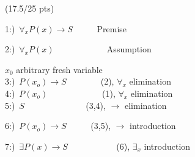 \documentclass[a4paper,12pt]{article}
\begin{document}
\hfill \small{(17.5/25 pts)}\\
\begin{tcolorbox}\begin{center}
1:)\, $\forall_x P(x) \rightarrow S  $\,\,\,\,\,\,\,\,\,\,\,\,\,\,\,  Premise
\begin{tcolorbox}
\begin{center}
    2:)\, $\forall_x P(x)   $\,\,\,\,\,\,\,\,\,\,\,\,\,\,\,\,\,\,\,\,\,\,\,\,\,\,\, \,\,\,\,\,\,       Assumption\\
    \begin{tcolorbox}
    \begin{center}
    $x_0$ arbitrary fresh variable \,\,\,\,\,\,\,\,\,\,\,\,\,\,\,\,\,\,\,\,\,\,\,\,\,\,\,\,\,\,\,\,\,\,\,\,\,\,\,\,\, \\
    3:)\, $ P(x_o)\rightarrow S   $\,\,\,\,\,\,\,\,\,\,\,\,\,\,\,\,\,\,\,\,\,\,    (2), $\forall_x$ elimination   \\
    4:)\, $ P(x_o)   $\,\,\,\,\,\,\,\,\,\,\,\,\,\,\,\,\,\,\,\,\,\,\,\,\,\,\,\,\,\,\,\,\,\,\,\,   (1), $\forall_x$ elimination   \\
    5:)\, $ S$\,\,\,\,\,\,\,\,\,\,\,\,\,\,\,\,\,\,\,\,\,\,\,\,\,\,\,\,\,\,\,\,\,\,\,\,\,\,\,\,\, (3,4), $\rightarrow $ elimination \\
    \end{center}
    \end{tcolorbox}
    6:)\, $ P(x_o) \rightarrow S   $\,\,\,\,\,\,\,\,\,\,\,\,\,\,\,   (3,5), $\rightarrow $ introduction \\
\end{center}
\end{tcolorbox}
7:)\, $\exists P(x) \rightarrow S $   \,\,\,\,\,\,\,\,\,\,\,\,\,\,\,\,\,\,\,\,\,\,\,\,\,\,\,\,\,\,  (6), $\exists_x $ introduction \\
\end{center}
\end{tcolorbox}
\end{document}
